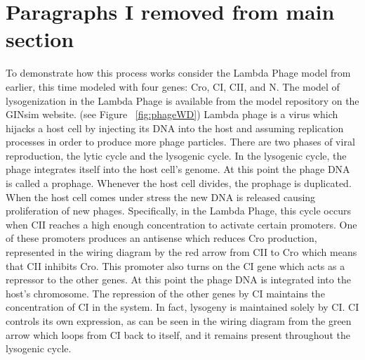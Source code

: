 \documentclass[11pt]{amsart}
\begin{document}
\appendix
\section{Paragraphs I removed from main section}
To demonstrate how this process works consider the Lambda Phage model from
earlier, this time modeled with four genes: Cro, CI, CII, and N. The model of
lysogenization in the Lambda Phage is available from the model repository on the GINsim website. (see Figure ~\ref{fig:phageWD})
Lambda phage is a virus which hijacks a host cell by injecting its DNA into
the host and assuming replication processes in order to produce more phage
particles.  There are two phases of viral reproduction, the lytic cycle and
the lysogenic cycle.  In the lysogenic cycle, the phage integrates itself into
the host cell's genome.  At this point the phage DNA is called a prophage.
Whenever the host cell divides, the prophage is duplicated.  When the host
cell comes under stress the new DNA is released causing proliferation of new
phages.  Specifically, in the Lambda Phage, this cycle occurs when CII reaches
a high enough concentration to activate certain promoters.  One of these
promoters produces an antisense which reduces Cro production, represented in
the wiring diagram by the red arrow from CII to Cro which means that CII
inhibits Cro.  This promoter also turns on the CI gene which acts as a
repressor to the other genes.  At this point the phage DNA is integrated into
the host's chromosome.  The repression of the other genes by CI maintains the
concentration of CI in the system.  In fact, lysogeny is maintained solely by
CI.  CI controls its own expression, as can be seen in the wiring diagram from
the green arrow which loops from CI back to itself, and it remains present
throughout the lysogenic cycle.

\end{document}
